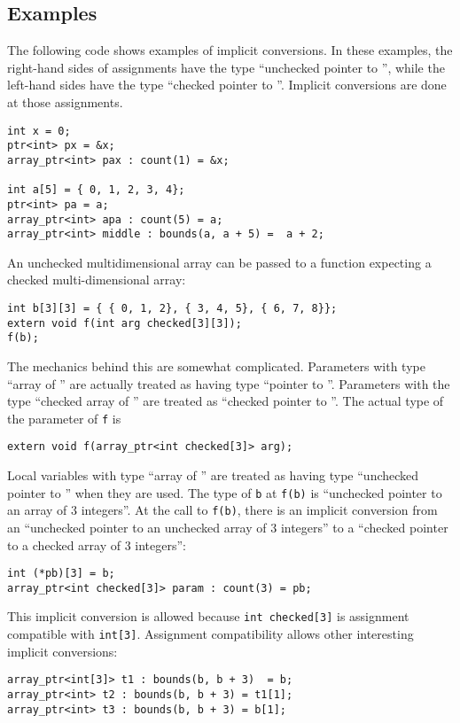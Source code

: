 \subsection{Examples}

The following code shows examples of implicit conversions.  In these examples,
the right-hand sides of assignments have the type ``unchecked pointer to
'', while the left-hand sides have the type ``checked pointer to
''.  Implicit conversions are done at those assignments.
\begin{verbatim}
int x = 0;
ptr<int> px = &x;
array_ptr<int> pax : count(1) = &x;

int a[5] = { 0, 1, 2, 3, 4};
ptr<int> pa = a;
array_ptr<int> apa : count(5) = a;
array_ptr<int> middle : bounds(a, a + 5) =  a + 2;
\end{verbatim}

An unchecked multidimensional array can be passed to a function expecting
a checked multi-dimensional array:
\begin{verbatim}
int b[3][3] = { { 0, 1, 2}, { 3, 4, 5}, { 6, 7, 8}};
extern void f(int arg checked[3][3]);
f(b);
\end{verbatim}

The mechanics behind this are somewhat complicated.  Parameters with type
``array of '' are actually treated as having type ``pointer to ''.
Parameters with the type ``checked array of '' are treated as ``checked
pointer to ''.  The actual type of the parameter of \texttt{f} is
\begin{verbatim}
extern void f(array_ptr<int checked[3]> arg);
\end{verbatim}
Local variables with type ``array of '' are treated as having
type ``unchecked pointer to '' when they are used.  The type of
\texttt{b} at \texttt{f(b)} is ``unchecked pointer to an array of 3 integers''.
At the call to  \texttt{f(b)}, there is an implicit conversion from an
``unchecked pointer to an unchecked array of 3 integers'' to a ``checked pointer
to a checked array of 3 integers'':
\begin{verbatim}
int (*pb)[3] = b;
array_ptr<int checked[3]> param : count(3) = pb;
\end{verbatim}
This implicit conversion is allowed because \verb|int checked[3]| is assignment
compatible with \verb|int[3]|.  Assignment compatibility allows other
interesting implicit conversions:
\begin{verbatim}
array_ptr<int[3]> t1 : bounds(b, b + 3)  = b;
array_ptr<int> t2 : bounds(b, b + 3) = t1[1];
array_ptr<int> t3 : bounds(b, b + 3) = b[1];
\end{verbatim}

